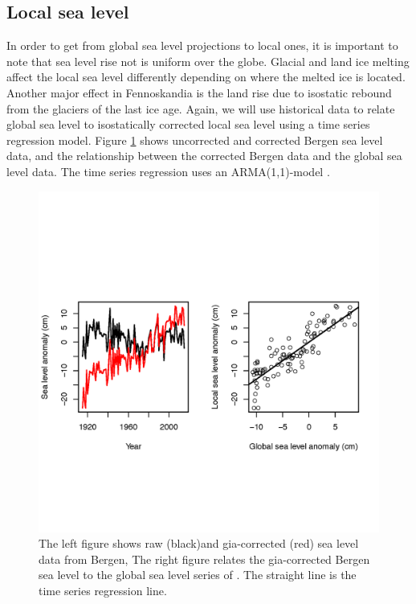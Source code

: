 \documentclass[wrr, draft]{agutex}
\begin{document}
\begin{article}
\subsection{Local sea level}
In order to get from global sea level projections to local ones, it is important to note that sea level rise not is uniform over the globe. Glacial and land ice melting affect the local sea level differently depending on where the melted ice is located.
Another major effect in Fennoskandia is the land rise due to isostatic rebound from the glaciers of the last ice age. 
Again, we will use historical data to relate global sea level to isostatically corrected local sea level using a time series regression model. Figure \ref{fig:obs} shows uncorrected and corrected Bergen sea level data, and the relationship between the corrected Bergen data and the global sea level data. The time series regression uses an ARMA(1,1)-model \citep{boxjenkins}.
\begin{figure}
\begin{center}
\includegraphics[width=39pc]{bergenfit.png}
\caption{ The left figure shows raw (black)and gia-corrected (red) sea level data from Bergen, The right figure relates the gia-corrected Bergen sea level to the global sea level series of \citet{csiro}. The straight line is the time series regression line.}
\label{fig:obs}
\end{center}
\end{figure}



\end{article}
\end{document}
